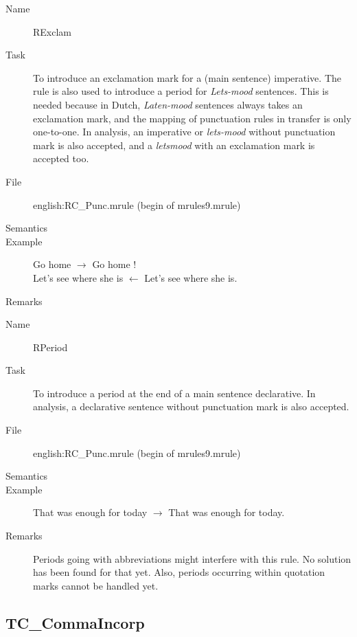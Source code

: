 \begin{description}
\vspace{1 cm}
\begin{description}
\item[Name] RExclam
\item[Task] To introduce an exclamation mark for a (main sentence) imperative. 
The rule is also used to introduce a period for {\em Lets-mood\/} sentences. 
This is needed because in Dutch, {\em Laten-mood\/} sentences always takes an 
exclamation mark, and the mapping of punctuation rules in transfer is only 
one-to-one.
In analysis, an imperative or {\em lets-mood\/} without punctuation mark is 
also accepted, and a {\em letsmood\/} with an exclamation mark is accepted too.
\item[File] english:RC\_Punc.mrule (begin of mrules9.mrule)
\item[Semantics]
\item[Example] Go home $\rightarrow$ Go home !\\
Let's see where she is $\leftarrow$ Let's see where she is.
\item[Remarks]
\end{description}

\vspace{1 cm}
\begin{description}
\item[Name] RPeriod
\item[Task] To introduce a period at the end of a main sentence declarative.
In analysis, a declarative sentence without punctuation mark is also accepted.
\item[File] english:RC\_Punc.mrule (begin of mrules9.mrule)
\item[Semantics]
\item[Example] That was enough for today $\rightarrow$ That was enough for 
today.
\item[Remarks] Periods going with abbreviations might interfere with this rule. 
No solution has been found for that yet. Also, periods occurring within 
quotation marks cannot be handled yet.
\end{description}

\end{description}

\newpage
\subsection{TC\_CommaIncorp}

